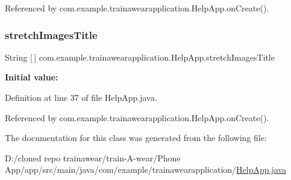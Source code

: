 Referenced by com.\+example.\+trainawearapplication.\+Help\+App.\+on\+Create().

\mbox{\label{classcom_1_1example_1_1trainawearapplication_1_1_help_app_a3f603b19da94b591732a36617c2eb91d}} 
\subsubsection{\texorpdfstring{stretchImagesTitle}{stretchImagesTitle}}
{\footnotesize\ttfamily String \mbox{[}$\,$\mbox{]} com.\+example.\+trainawearapplication.\+Help\+App.\+stretch\+Images\+Title\hspace{0.3cm}{\ttfamily [private]}}

{\bfseries Initial value\+:}
\begin{DoxyCode}{0}
\DoxyCodeLine{            \textcolor{stringliteral}{"Str1"}, \textcolor{stringliteral}{"Str2"}, \textcolor{stringliteral}{"Str3"}}
\DoxyCodeLine{    \}}

\end{DoxyCode}


Definition at line 37 of file Help\+App.\+java.



Referenced by com.\+example.\+trainawearapplication.\+Help\+App.\+on\+Create().



The documentation for this class was generated from the following file\+:\begin{DoxyCompactItemize}
\item 
D\+:/cloned repo trainawear/train-\/\+A-\/wear/\+Phone App/app/src/main/java/com/example/trainawearapplication/\mbox{\hyperlink{_help_app_8java}{Help\+App.\+java}}\end{DoxyCompactItemize}
